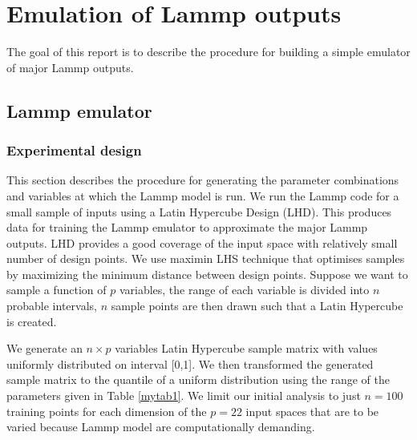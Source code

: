 \documentclass[12pt,titlepage]{report}
\theoremstyle{definition}
\theoremstyle{remark}
\begin{document}
\chapter*{Emulation of Lammp outputs}
The goal of this report is to describe the procedure for building a simple emulator of major Lammp outputs.
\section*{Lammp emulator}
\subsection*{Experimental design}
This section describes the procedure for generating the parameter combinations and variables at which the Lammp model is run. We run the Lammp code for a small sample of inputs using a Latin Hypercube Design (LHD). This produces data for training the Lammp emulator to approximate the major Lammp outputs. LHD provides a good coverage of the input space with relatively small number of design points. We use maximin LHS technique that optimises samples by maximizing the minimum distance between design points. Suppose we want to sample a function of $p$ variables, the range of each variable is divided into $n$ probable intervals, $n$ sample points are then drawn such that a Latin Hypercube is created.

We generate an $n \times p$ variables Latin Hypercube sample matrix with values uniformly distributed on interval [0,1]. We then transformed the generated sample matrix to the quantile of a uniform distribution using the range of the parameters given in Table \ref{mytab1}. We limit our initial analysis to just $n=100$ training points for each dimension of the $p=22$ input spaces that are to be varied because Lammp model are computationally demanding. %

\end{document}
